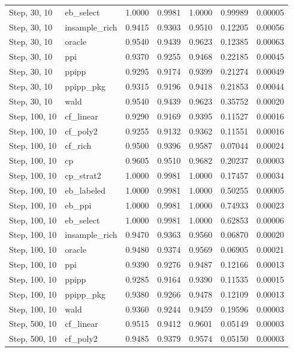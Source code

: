 \begin{longtable}{llrrrrr}
Step, 30, 10 & eb\_select & 1.0000 & 0.9981 & 1.0000 & 0.99989 & 0.00005 \\
Step, 30, 10 & insample\_rich & 0.9415 & 0.9303 & 0.9510 & 0.12205 & 0.00056 \\
Step, 30, 10 & oracle & 0.9540 & 0.9439 & 0.9623 & 0.12385 & 0.00063 \\
Step, 30, 10 & ppi & 0.9370 & 0.9255 & 0.9468 & 0.22185 & 0.00045 \\
Step, 30, 10 & ppipp & 0.9295 & 0.9174 & 0.9399 & 0.21274 & 0.00049 \\
Step, 30, 10 & ppipp\_pkg & 0.9315 & 0.9196 & 0.9418 & 0.21853 & 0.00044 \\
Step, 30, 10 & wald & 0.9540 & 0.9439 & 0.9623 & 0.35752 & 0.00020 \\
Step, 100, 10 & cf\_linear & 0.9290 & 0.9169 & 0.9395 & 0.11527 & 0.00016 \\
Step, 100, 10 & cf\_poly2 & 0.9255 & 0.9132 & 0.9362 & 0.11551 & 0.00016 \\
Step, 100, 10 & cf\_rich & 0.9500 & 0.9396 & 0.9587 & 0.07044 & 0.00024 \\
Step, 100, 10 & cp & 0.9605 & 0.9510 & 0.9682 & 0.20237 & 0.00003 \\
Step, 100, 10 & cp\_strat2 & 1.0000 & 0.9981 & 1.0000 & 0.17457 & 0.00034 \\
Step, 100, 10 & eb\_labeled & 1.0000 & 0.9981 & 1.0000 & 0.50255 & 0.00005 \\
Step, 100, 10 & eb\_ppi & 1.0000 & 0.9981 & 1.0000 & 0.74933 & 0.00023 \\
Step, 100, 10 & eb\_select & 1.0000 & 0.9981 & 1.0000 & 0.62853 & 0.00006 \\
Step, 100, 10 & insample\_rich & 0.9470 & 0.9363 & 0.9560 & 0.06870 & 0.00020 \\
Step, 100, 10 & oracle & 0.9480 & 0.9374 & 0.9569 & 0.06905 & 0.00021 \\
Step, 100, 10 & ppi & 0.9390 & 0.9276 & 0.9487 & 0.12166 & 0.00013 \\
Step, 100, 10 & ppipp & 0.9285 & 0.9164 & 0.9390 & 0.11535 & 0.00015 \\
Step, 100, 10 & ppipp\_pkg & 0.9380 & 0.9266 & 0.9478 & 0.12109 & 0.00013 \\
Step, 100, 10 & wald & 0.9360 & 0.9244 & 0.9459 & 0.19596 & 0.00003 \\
Step, 500, 10 & cf\_linear & 0.9515 & 0.9412 & 0.9601 & 0.05149 & 0.00003 \\
Step, 500, 10 & cf\_poly2 & 0.9485 & 0.9379 & 0.9574 & 0.05150 & 0.00003 \\

\end{longtable}
